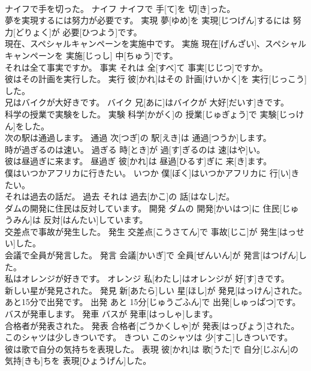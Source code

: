 \documentclass[8pt]{extreport}
\begin{document}
\begin{CJK}{UTF8}{min}
\\	ナイフで手を切った。	ナイフ	ナイフで 手[て]を 切[き]った。	
\\	夢を実現するには努力が必要です。	実現	夢[ゆめ]を 実現[じつげん]するには 努力[どりょく]が 必要[ひつよう]です。	
\\	現在、スペシャルキャンペーンを実施中です。	実施	現在[げんざい]、スペシャルキャンペーンを 実施[じっし] 中[ちゅう]です。	
\\	それは全て事実ですか。	事実	それは 全[すべ]て 事実[じじつ]ですか。	
\\	彼はその計画を実行した。	実行	彼[かれ]はその 計画[けいかく]を 実行[じっこう]した。	
\\	兄はバイクが大好きです。	バイク	兄[あに]はバイクが 大好[だいす]きです。	
\\	科学の授業で実験をした。	実験	科学[かがく]の 授業[じゅぎょう]で 実験[じっけん]をした。	
\\	次の駅は通過します。	通過	次[つぎ]の 駅[えき]は 通過[つうか]します。	
\\	時が過ぎるのは速い。	過ぎる	時[とき]が 過[す]ぎるのは 速[はや]い。	
\\	彼は昼過ぎに来ます。	昼過ぎ	彼[かれ]は 昼過[ひるす]ぎに 来[き]ます。	
\\	僕はいつかアフリカに行きたい。	いつか	僕[ぼく]はいつかアフリカに 行[い]きたい。	
\\	それは過去の話だ。	過去	それは 過去[かこ]の 話[はなし]だ。	
\\	ダムの開発に住民は反対しています。	開発	ダムの 開発[かいはつ]に 住民[じゅうみん]は 反対[はんたい]しています。	
\\	交差点で事故が発生した。	発生	交差点[こうさてん]で 事故[じこ]が 発生[はっせい]した。	
\\	会議で全員が発言した。	発言	会議[かいぎ]で 全員[ぜんいん]が 発言[はつげん]した。	
\\	私はオレンジが好きです。	オレンジ	私[わたし]はオレンジが 好[す]きです。	
\\	新しい星が発見された。	発見	新[あたら]しい 星[ほし]が 発見[はっけん]された。	
\\	あと15分で出発です。	出発	あと 15分[じゅうごふん]で 出発[しゅっぱつ]です。	
\\	バスが発車します。	発車	バスが 発車[はっしゃ]します。	
\\	合格者が発表された。	発表	合格者[ごうかくしゃ]が 発表[はっぴょう]された。	
\\	このシャツは少しきついです。	きつい	このシャツは 少[すこ]しきついです。	
\\	彼は歌で自分の気持ちを表現した。	表現	彼[かれ]は 歌[うた]で 自分[じぶん]の 気持[きも]ちを 表現[ひょうげん]した。	

\end{CJK}
\end{document}
